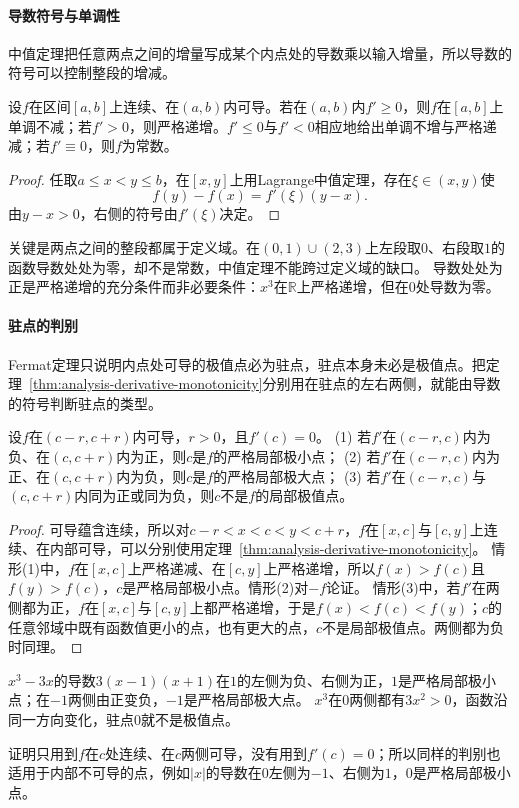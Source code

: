\paragraph{导数符号与单调性}
中值定理把任意两点之间的增量写成某个内点处的导数乘以输入增量，所以导数的符号可以控制整段的增减。
\begin{theorem}[导数符号与单调性]
\label{thm:analysis-derivative-monotonicity}
设$f$在区间$[a,b]$上连续、在$(a,b)$内可导。若在$(a,b)$内$f'\geq0$，则$f$在$[a,b]$上单调不减；若$f'>0$，则严格递增。$f'\leq0$与$f'<0$相应地给出单调不增与严格递减；若$f'\equiv0$，则$f$为常数。
\end{theorem}
\begin{proof}
任取$a\leq x<y\leq b$，在$[x,y]$上用Lagrange中值定理，存在$\xi\in(x,y)$使
\[
 f(y)-f(x)=f'(\xi)(y-x).
\]
由$y-x>0$，右侧的符号由$f'(\xi)$决定。
\end{proof}
关键是两点之间的整段都属于定义域。在$(0,1)\cup(2,3)$上左段取$0$、右段取$1$的函数导数处处为零，却不是常数，中值定理不能跨过定义域的缺口。
导数处处为正是严格递增的充分条件而非必要条件：$x^3$在$\mathbb R$上严格递增，但在$0$处导数为零。

\paragraph{驻点的判别}
Fermat定理只说明内点处可导的极值点必为驻点，驻点本身未必是极值点。把定理~\ref{thm:analysis-derivative-monotonicity}分别用在驻点的左右两侧，就能由导数的符号判断驻点的类型。
\begin{theorem}[驻点的一阶判别]
\label{thm:ru-first-derivative-test}
设$f$在$(c-r,c+r)$内可导，$r>0$，且$f'(c)=0$。
(1) 若$f'$在$(c-r,c)$内为负、在$(c,c+r)$内为正，则$c$是$f$的严格局部极小点；
(2) 若$f'$在$(c-r,c)$内为正、在$(c,c+r)$内为负，则$c$是$f$的严格局部极大点；
(3) 若$f'$在$(c-r,c)$与$(c,c+r)$内同为正或同为负，则$c$不是$f$的局部极值点。
\end{theorem}
\begin{proof}
可导蕴含连续，所以对$c-r<x<c<y<c+r$，$f$在$[x,c]$与$[c,y]$上连续、在内部可导，可以分别使用定理~\ref{thm:analysis-derivative-monotonicity}。
情形(1)中，$f$在$[x,c]$上严格递减、在$[c,y]$上严格递增，所以$f(x)>f(c)$且$f(y)>f(c)$，$c$是严格局部极小点。情形(2)对$-f$论证。
情形(3)中，若$f'$在两侧都为正，$f$在$[x,c]$与$[c,y]$上都严格递增，于是$f(x)<f(c)<f(y)$；$c$的任意邻域中既有函数值更小的点，也有更大的点，$c$不是局部极值点。两侧都为负时同理。
\end{proof}
\begin{example}[用一阶判别区分驻点]
\label{ex:ru-first-derivative-test}
$x^3-3x$的导数$3(x-1)(x+1)$在$1$的左侧为负、右侧为正，$1$是严格局部极小点；在$-1$两侧由正变负，$-1$是严格局部极大点。
$x^3$在$0$两侧都有$3x^2>0$，函数沿同一方向变化，驻点$0$就不是极值点。
\end{example}
证明只用到$f$在$c$处连续、在$c$两侧可导，没有用到$f'(c)=0$；所以同样的判别也适用于内部不可导的点，例如$|x|$的导数在$0$左侧为$-1$、右侧为$1$，$0$是严格局部极小点。

